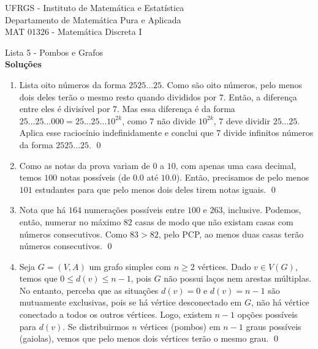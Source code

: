 \documentclass{article}
\begin{document}
\begin{flushleft}
    UFRGS - Instituto de Matemática e Estatística \\
    Departamento de Matemática Pura e Aplicada \\
    MAT 01326 - Matemática Discreta I \\
\end{flushleft}
\vspace{0.25cm}

\begin{center}
    {\LARGE Lista 5 - Pombos e Grafos} \\
    \vspace{0.4cm}
    {\large \textbf{Soluções}}

\end{center}

\begin{enumerate}
    \item [\textbf{E1}]
        Lista oito números da forma \(2525...25\). Como são oito números, pelo menos dois deles terão o mesmo resto quando divididos por \(7\). Então, a diferença entre eles é divisível por \(7\). Mas essa diferença é da forma \(25...25...000 = 25...25...10^{2k}\), como \(7\) não divide \(10^{2k}\), \(7\) deve dividir \(25...25\).
        Aplica esse raciocínio indefinidamente e conclui que \(7\) divide infinitos números da forma \(2525...25\). \qed
    \item [\textbf{E2}]
        Como as notas da prova variam de \(0\) a \(10\), com apenas uma casa decimal, temos \(100\) notas possíveis (de \(0.0\) até \(10.0\)). Então, precisamos de pelo menos \(101\) estudantes para que pelo menos dois deles tirem notas iguais. \qed
    \item [\textbf{E3}]
        Nota que há \(164\) numerações possíveis entre \(100\) e \(263\), inclusive. Podemos, então, numerar no máximo \(82\) casas de modo que não existam casas com números consecutivos. Como \(83 > 82\), pelo PCP, ao menos duas casas terão números consecutivos. \qed
    \item [\textbf{E4}]
        Seja \(G = (V, A)\) um grafo simples com \(n \geq 2\) vértices. Dado \(v \in V(G)\), temos que \(0 \leq d(v) \leq n-1\), pois \(G\) não possui laços nem arestas múltiplas.
        No entanto, perceba que as situações \(d(v) = 0\) e \(d(v) = n-1\) são mutuamente exclusivas, pois se há vértice desconectado em \(G\), não há vértice conectado a todos os outros vértices. Logo, existem \(n-1\) opções possíveis para \(d(v)\).
        Se distribuirmos \(n\) vértices (pombos) em \(n-1\) graus possíveis (gaiolas), vemos que pelo menos dois vértices terão o mesmo grau. \qed    

\end{enumerate}
\end{document}
